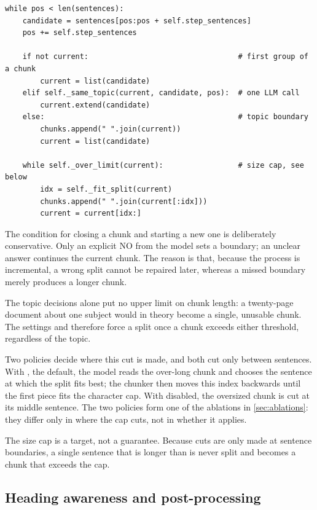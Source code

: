 \begin{lstlisting}[caption={The assembly loop, condensed.},label={lst:loop}]
while pos < len(sentences):
    candidate = sentences[pos:pos + self.step_sentences]
    pos += self.step_sentences

    if not current:                                  # first group of a chunk
        current = list(candidate)
    elif self._same_topic(current, candidate, pos):  # one LLM call
        current.extend(candidate)
    else:                                            # topic boundary
        chunks.append(" ".join(current))
        current = list(candidate)

    while self._over_limit(current):                 # size cap, see below
        idx = self._fit_split(current)
        chunks.append(" ".join(current[:idx]))
        current = current[idx:]
\end{lstlisting}

The condition for closing a chunk and starting a new one is deliberately conservative.
Only an explicit NO from the model sets a boundary; an unclear answer continues the
current chunk. The reason is that, because the process is incremental, a wrong split
cannot be repaired later, whereas a missed boundary merely produces a longer chunk.

The topic decisions alone put no upper limit on chunk length: a twenty-page document about
one subject would in theory become a single, unusable chunk. The settings
 and  therefore force a split once a
chunk exceeds either threshold, regardless of the topic.

Two policies decide where this cut is made, and both cut only between sentences. With
, the default, the model reads the over-long chunk and chooses the
sentence at which the split fits best; the chunker then moves this index backwards until
the first piece fits the character cap. With  disabled, the oversized
chunk is cut at its middle sentence. The two policies form one of the ablations in
\cref{sec:ablations}: they differ only in where the cap cuts, not in whether it applies.

The size cap is a target, not a guarantee. Because cuts are only made at sentence
boundaries, a single sentence that is longer than  is never split
and becomes a chunk that exceeds the cap.

\subsection{Heading awareness and post-processing}
\label{sec:impl-headings}
\label{sec:impl-postproc}

